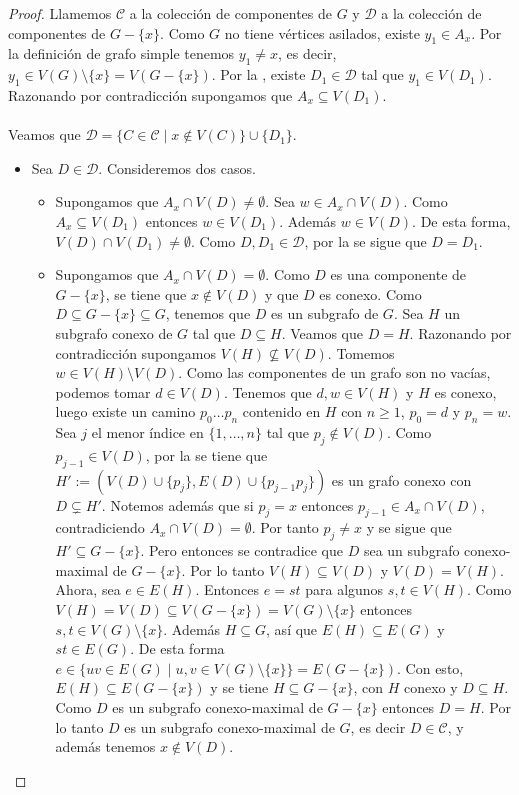 \begin{proof}
   Llamemos $\mathcal{C}$ a la colección de componentes de $G$ y $\mathcal{D}$ a la colección de componentes de $G-\{x\}$. Como $G$ no tiene vértices asilados, existe $y_1\in A_x$. Por la definición de grafo simple tenemos $y_1\ne x$, es decir, $y_1\in V(G)\setminus \{x\}=V(G-\{x\})$. Por la , existe $D_1\in\mathcal{D}$ tal que $y_1\in V(D_1)$. Razonando por contradicción supongamos que $A_x\subseteq V(D_1)$.\\\\
   Veamos que $\mathcal{D}=\{C\in \mathcal{C}\mid x\notin V(C)\}\cup \{D_1\}$.
   \begin{itemize}
      \item[$\subseteq$:] Sea $D\in\mathcal{D}$. Consideremos dos casos.
         \begin{itemize}
            \item[\textbf{I.}] Supongamos que $A_x\cap V(D) \ne\emptyset$. Sea $w\in A_x\cap V(D)$. Como $A_x\subseteq V(D_1)$ entonces $w\in V(D_1)$. Además $w\in V(D)$. De esta forma, $V(D)\cap V(D_1)\ne\emptyset$. Como $D,D_1\in\mathcal{D}$, por la  se sigue que $D=D_1$.   
            \item[\textbf{II.}] Supongamos que $A_x\cap V(D) = \emptyset$. Como $D$ es una componente de $G-\{x\}$, se tiene que $x\notin V(D)$ y que $D$ es conexo. Como $D\subseteq G-\{x\} \subseteq G$, tenemos que $D$ es un subgrafo de $G$. Sea $H$ un subgrafo conexo de $G$ tal que $D\subseteq H$. Veamos que $D=H$. Razonando por contradicción supongamos $V(H)\nsubseteq V(D)$. Tomemos $w\in V(H)\setminus V(D)$. Como las componentes de un grafo son no vacías, podemos tomar $d\in V(D)$. Tenemos que $d,w\in V(H)$ y $H$ es conexo, luego existe un camino $p_0\dots p_n$ contenido en $H$ con $n\ge 1$, $p_0=d$ y $p_n=w$. Sea $j$ el menor índice en $\{1,\dots , n\}$ tal que $p_j\notin V(D)$. Como $p_{j-1}\in V(D)$, por la  se tiene que $H':=(V(D)\cup \{p_j\},E(D)\cup \{p_{j-1}p_j\})$ es un grafo conexo con $D\subsetneq H'$. Notemos además que si $p_j=x$ entonces $p_{j-1}\in A_x\cap V(D)$, contradiciendo $A_x\cap V(D)=\emptyset$. Por tanto $p_j\ne x$ y se sigue que $H'\subseteq G-\{x\}$. Pero entonces se contradice que $D$ sea un subgrafo conexo-maximal de $G-\{x\}$. Por lo tanto $V(H)\subseteq V(D)$ y $V(D)=V(H)$. Ahora, sea $e\in E(H)$. Entonces $e=st$ para algunos $s,t\in V(H)$. Como $V(H)=V(D)\subseteq V(G-\{x\})=V(G)\setminus\{x\}$ entonces $s,t\in V(G)\setminus\{x\}$. Además $H\subseteq G$, así que $E(H)\subseteq E(G)$ y $st\in E(G)$. De esta forma $e\in\{uv\in E(G)\mid u,v\in V(G)\setminus \{x\}\}=E(G-\{x\})$. Con esto, $E(H)\subseteq E(G-\{x\})$ y se tiene $H\subseteq G-\{x\}$, con $H$ conexo y $D\subseteq H$. Como $D$ es un subgrafo conexo-maximal de $G-\{x\}$ entonces $D=H$. Por lo tanto $D$ es un subgrafo conexo-maximal de $G$, es decir $D\in\mathcal{C}$, y además tenemos $x\notin V(D)$.

\end{itemize}
\end{itemize}
\end{proof}
